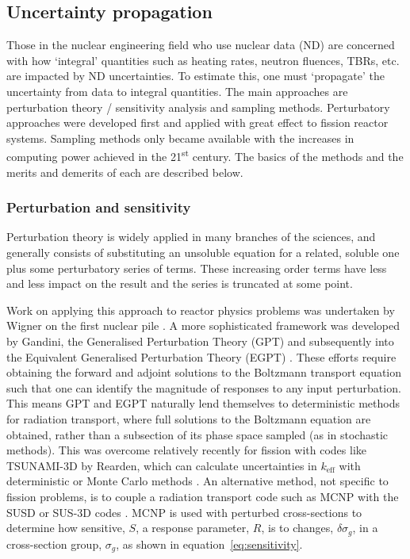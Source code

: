 \FloatBarrier
\subsection{Uncertainty propagation}
Those in the nuclear engineering field who use nuclear data (ND) are concerned with how `integral' quantities such as heating rates, neutron fluences, TBRs, etc. are impacted by ND uncertainties. To estimate this, one must `propagate' the uncertainty from data to integral quantities. The main approaches are perturbation theory / sensitivity analysis and sampling methods. Perturbatory approaches were developed first and applied with great effect to fission reactor systems. Sampling methods only became available with the increases in computing power achieved in the 21\textsuperscript{st} century. The basics of the methods and the merits and demerits of each are described below.

\FloatBarrier
\subsubsection{Perturbation and sensitivity}
\label{subsubsec:pert}
Perturbation theory is widely applied in many branches of the sciences, and generally consists of substituting an unsoluble equation for a related, soluble one plus some perturbatory series of terms. These increasing order terms have less and less impact on the result and the series is truncated at some point. 

Work on applying this approach to reactor physics problems was undertaken by Wigner on the first nuclear pile \cite{Rising2012}. A more sophisticated framework was developed by Gandini, the Generalised Perturbation Theory (GPT) \cite{Gandini1967} and subsequently into the Equivalent Generalised Perturbation Theory (EGPT) \cite{Gandini1986}. These efforts require obtaining the forward and adjoint solutions to the Boltzmann transport equation such that one can identify the magnitude of responses to any input perturbation. This means GPT and EGPT naturally lend themselves to deterministic methods for radiation transport, where full solutions to the Boltzmann equation are obtained, rather than a subsection of its phase space sampled (as in stochastic methods). This was overcome relatively recently for fission with codes like TSUNAMI-3D by Rearden, which can calculate uncertainties in $k_{\mathrm{eff}}$ with deterministic or Monte Carlo methods \cite{Rearden2004}. An alternative method, not specific to fission problems, is to couple a radiation transport code such as MCNP \cite{Goorley2012} with the SUSD or SUS-3D codes \cite{Kodeli2001}. MCNP is used with perturbed cross-sections to determine how sensitive, $S$, a response parameter, $R$, is to changes, $\delta \sigma_{g}$, in a cross-section group, $\sigma_{g}$, as shown in equation~\ref{eq:sensitivity}. 

